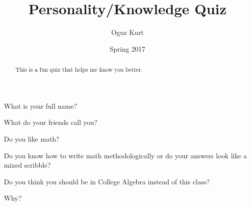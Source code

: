 \documentclass[handout]{ximera}
\title{Personality/Knowledge Quiz}
\author{Oguz Kurt}
\date{Spring 2017}
\begin{document}
\begin{abstract}
This is a fun quiz that helps me know you better.
\end{abstract} 
\maketitle

\begin{question}
What is your full name?
\begin{freeResponse}
\end{freeResponse}
\end{question}

\begin{question}
What do your friends call you?
\begin{freeResponse}
\end{freeResponse}
\end{question}

\begin{question}
Do you like math?
\begin{multipleChoice*}
\end{multipleChoice*}
\end{question}


\begin{question}
Do you know how to write math methodologically or do your answers look like a mixed scribble?

\begin{multipleChoice*}
\end{multipleChoice*}
\end{question}


\begin{question}
Do you think you should be in College Algebra instead of this class? 
\begin{multipleChoice*}
\end{multipleChoice*}

Why?
\begin{freeResponse}

\end{freeResponse}
\end{question}
\end{document}
